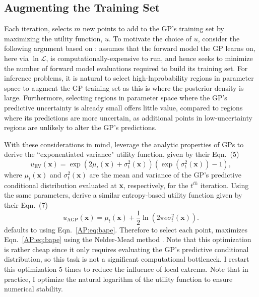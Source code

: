 \subsection{Augmenting the Training Set} \label{AP:sec:augment}

Each iteration, \approxposterior selects $m$ new points to add to the GP's training set by maximizing the utility function, $u$. To motivate the choice of $u$, consider the following argument based on \citet{Kandasamy2017}: \approxposterior assumes that the forward model the GP learns on, here \vplanet via $\ln \mathcal{L}$, is computationally-expensive to run, and hence \approxposterior seeks to minimize the number of forward model evaluations required to build its training set. For inference problems, it is natural to select high-lnprobability regions in parameter space to augment the GP training set as this is where the posterior density is large. Furthermore, selecting regions in parameter space where the GP's predictive uncertainty is already small offers little value, compared to regions where its predictions are more uncertain, as additional points in low-uncertainty regions are unlikely to alter the GP's predictions. 

With these considerations in mind, \citet{Kandasamy2017} leverage the analytic properties of GPs to derive the ``exponentiated variance" utility function, given by their Eqn.~(5)
\begin{equation} \label{AP:eq:bape}
    u_{\textrm{EV}}(\textbf{x}) = \exp(2 \mu_t(\textbf{x}) + \sigma_t^2(\textbf{x}))(\exp(\sigma_t^2(\textbf{x})) - 1),
\end{equation}
where $\mu_t(\textbf{x})$ and $\sigma_t^2(\textbf{x})$ are the mean and variance of the GP's predictive conditional distribution evaluated at \textbf{x}, respectively, for the $t^{th}$ \approxposterior iteration. Using the same parameters, \citet{Wang2018} derive a similar entropy-based utility function given by their Eqn.~(7)
\begin{equation} \label{AP:eq:agp}
    u_{\textrm{AGP}}(\textbf{x}) =\mu_t(\textbf{x}) + \frac{1}{2} \ln(2 \pi e \sigma_t^2(\textbf{x})).
\end{equation}
\approxposterior defaults to using Eqn.~\ref{AP:eq:bape}. Therefore to select each point, \approxposterior maximizes Eqn.~\ref{AP:eq:bape} using the Nelder-Mead method \citep{Nelder1965}. Note that this optimization is rather cheap since it only requires evaluating the GP's predictive conditional distribution, so this task is not a significant computational bottleneck. I restart this optimization 5 times to reduce the influence of local extrema. Note that in practice, I optimize the natural logarithm of the utility function to ensure numerical stability.

